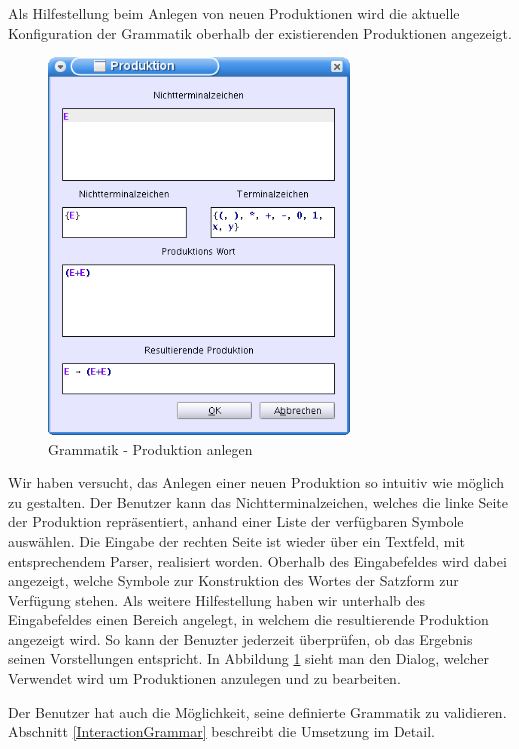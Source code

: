 Als Hilfestellung beim Anlegen von neuen Produktionen wird die aktuelle
Konfiguration der Grammatik oberhalb der existierenden Produktionen
angezeigt.\vspace{10pt}


\begin{figure}[h!]
\begin{center}
\includegraphics[width=8cm]{../images/production_dialog.png}
\caption{Grammatik - Produktion anlegen}
\label{FigureAddProduction}
\end{center}
\end{figure}
\vspace{10pt}

Wir haben versucht, das Anlegen einer neuen Produktion so intuitiv wie möglich
zu gestalten. Der Benutzer kann das Nichtterminalzeichen, welches die linke
Seite der Produktion repräsentiert, anhand einer Liste der
verfügbaren Symbole auswählen. Die Eingabe der rechten Seite ist
wieder über ein Textfeld, mit entsprechendem Parser, realisiert
worden. Oberhalb des Eingabefeldes wird dabei angezeigt, welche Symbole zur
Konstruktion des Wortes der Satzform zur Verfügung stehen. Als weitere
Hilfestellung haben wir unterhalb des Eingabefeldes einen Bereich angelegt,
in welchem die resultierende Produktion angezeigt wird. So kann der
Benuzter jederzeit überprüfen, ob das Ergebnis seinen
Vorstellungen entspricht. In Abbildung \ref{FigureAddProduction}
sieht man den Dialog, welcher Verwendet wird um Produktionen
anzulegen und zu bearbeiten.\vspace{10pt}

Der Benutzer hat auch die Möglichkeit, seine definierte Grammatik zu validieren.
Abschnitt \ref{InteractionGrammar} beschreibt die Umsetzung im
Detail.\vspace{10pt}


